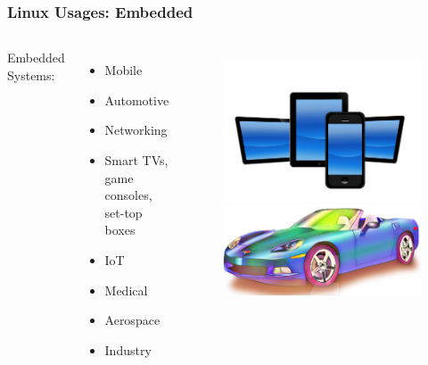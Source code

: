 \documentclass[aspectratio=169]{beamer}
\begin{document}
\begin{frame}
  \frametitle{Linux Usages: Embedded}
  \begin{columns}
    Embedded Systems:
     \begin{itemize}
       \item Mobile
       \item Automotive
       \item Networking
       \item Smart TVs, game consoles, set-top boxes
       \item IoT
       \item Medical
       \item Aerospace
       \item Industry
     \end{itemize}
    \begin{figure}
      \includegraphics[scale=0.04]{images/mobile.jpg}
      \includegraphics[scale=0.4]{images/car.png}

\end{figure}
\end{columns}
\end{frame}
\end{document}
